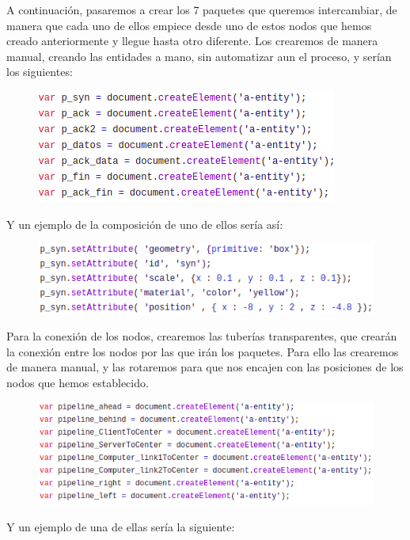 \documentclass[a4paper, 12pt]{book}
\begin{document}
A continuación, pasaremos a crear los 7 paquetes que queremos intercambiar, de manera que cada uno de ellos empiece desde uno de estos nodos que hemos creado anteriormente y llegue hasta otro diferente. Los crearemos de manera manual, creando las entidades a mano, sin automatizar aun el proceso, y serían los siguientes:

\begin{figure}[h]
\centering
    \includegraphics[scale=0.8]{img/paso2_2a.png}
\end{figure}

Y un ejemplo de la composición de uno de ellos sería así:

\begin{figure}[h]
\centering
    \includegraphics[scale=0.8]{img/paso2_2aa.png}
\end{figure}


Para la conexión de los nodos, crearemos las tuberías transparentes, que crearán la conexión entre los nodos por las que irán los paquetes. Para ello las crearemos de manera manual, y las rotaremos para que nos encajen con las posiciones de los nodos que hemos establecido.



\begin{figure}[h]
\centering
    \includegraphics[scale=0.8]{img/paso2_2bb.png}
\end{figure}

\newpage
Y un ejemplo de una de ellas sería la siguiente:
\end{document}

